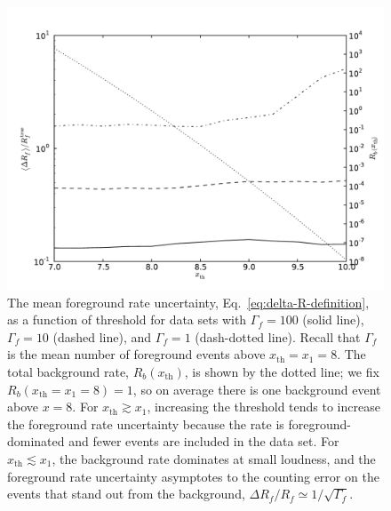 \documentclass[aps,prd,reprint,nofootinbib]{revtex4-1}
\begin{document}
\begin{figure}
  \includegraphics[width=\columnwidth]{threshold.pdf}
  \caption{\label{fig:threshold-rate-dependence} The mean foreground
    rate uncertainty, Eq.~\eqref{eq:delta-R-definition}, as a function
    of threshold for data sets with $\Gamma_f = 100$ (solid line),
    $\Gamma_f = 10$ (dashed line), and $\Gamma_f = 1$ (dash-dotted
    line).  Recall that $\Gamma_f$ is the mean number of foreground
    events above $x_\mathrm{th}=x_1= 8$.  The total background rate,
    $R_b\left( x_\mathrm{th} \right)$, is shown by the dotted line; we
    fix $R_b \left( x_\mathrm{th} = x_1 = 8\right) = 1$, so on average
    there is one background event above $x = 8$.  For $x_\mathrm{th}
    \gtrsim x_1$, increasing the threshold tends to increase the
    foreground rate uncertainty because the rate is
    foreground-dominated and fewer events are included in the data
    set.  For $x_\mathrm{th} \lesssim x_1$, the background rate
    dominates at small loudness, and the foreground rate uncertainty
    asymptotes to the counting error on the events that stand out from
    the background, $\Delta R_f / R_f \simeq 1/\sqrt{\Gamma_f}$.}
\end{figure}
\end{document}
